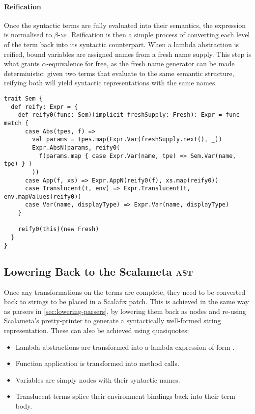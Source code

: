 \documentclass[../../../main.tex]{subfiles}
\begin{document}
\paragraph{Reification}
Once the syntactic terms are fully evaluated into their semantics, the expression is normalised to $\beta$-\textsc{nf}.
Reification is then a simple process of converting each level of the term back into its syntactic counterpart.
When a lambda abstraction is reified, bound variables are assigned names from a fresh name supply.
This step is what grants $\alpha$-equivalence for free, as the fresh name generator can be made deterministic: given two terms that evaluate to the same semantic structure, reifying both will yield syntactic representations with the same names.
%
\begin{verbatim}
trait Sem {
  def reify: Expr = {
    def reify0(func: Sem)(implicit freshSupply: Fresh): Expr = func match {
      case Abs(tpes, f) =>
        val params = tpes.map(Expr.Var(freshSupply.next(), _))
        Expr.AbsN(params, reify0(
          f(params.map { case Expr.Var(name, tpe) => Sem.Var(name, tpe) } )
        ))
      case App(f, xs) => Expr.AppN(reify0(f), xs.map(reify0))
      case Translucent(t, env) => Expr.Translucent(t, env.mapValues(reify0))
      case Var(name, displayType) => Expr.Var(name, displayType)
    }

    reify0(this)(new Fresh)
  }
}
\end{verbatim}

\subsection{Lowering Back to the Scalameta \textsc{ast}}
Once any transformations on the  terms are complete, they need to be converted back to strings to be placed in a Scalafix patch.
This is achieved in the same way as parsers in \cref{sec:lowering-parsers}, by lowering them back as   nodes and re-using Scalameta's pretty-printer to generate a syntactically well-formed string representation.
These can also be achieved using quasiquotes:
\begin{itemize}
  \item Lambda abstractions are transformed into a lambda expression of form .
  \item Function application is transformed into method calls.
  \item Variables are simply  nodes with their syntactic names.
  \item Translucent terms splice their environment bindings back into their term body.
\end{itemize}
\end{document}
